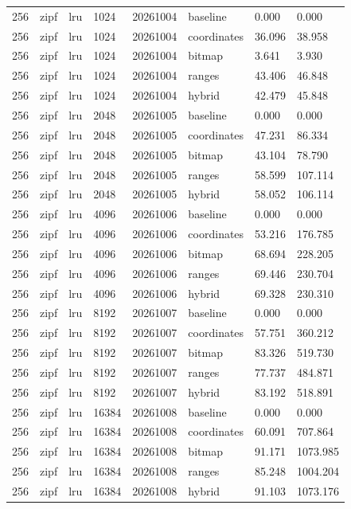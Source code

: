 \begin{tabular}{llllllll}
256 & zipf & lru & 1024 & 20261004 & baseline & 0.000 & 0.000 \\
256 & zipf & lru & 1024 & 20261004 & coordinates & 36.096 & 38.958 \\
256 & zipf & lru & 1024 & 20261004 & bitmap & 3.641 & 3.930 \\
256 & zipf & lru & 1024 & 20261004 & ranges & 43.406 & 46.848 \\
256 & zipf & lru & 1024 & 20261004 & hybrid & 42.479 & 45.848 \\
256 & zipf & lru & 2048 & 20261005 & baseline & 0.000 & 0.000 \\
256 & zipf & lru & 2048 & 20261005 & coordinates & 47.231 & 86.334 \\
256 & zipf & lru & 2048 & 20261005 & bitmap & 43.104 & 78.790 \\
256 & zipf & lru & 2048 & 20261005 & ranges & 58.599 & 107.114 \\
256 & zipf & lru & 2048 & 20261005 & hybrid & 58.052 & 106.114 \\
256 & zipf & lru & 4096 & 20261006 & baseline & 0.000 & 0.000 \\
256 & zipf & lru & 4096 & 20261006 & coordinates & 53.216 & 176.785 \\
256 & zipf & lru & 4096 & 20261006 & bitmap & 68.694 & 228.205 \\
256 & zipf & lru & 4096 & 20261006 & ranges & 69.446 & 230.704 \\
256 & zipf & lru & 4096 & 20261006 & hybrid & 69.328 & 230.310 \\
256 & zipf & lru & 8192 & 20261007 & baseline & 0.000 & 0.000 \\
256 & zipf & lru & 8192 & 20261007 & coordinates & 57.751 & 360.212 \\
256 & zipf & lru & 8192 & 20261007 & bitmap & 83.326 & 519.730 \\
256 & zipf & lru & 8192 & 20261007 & ranges & 77.737 & 484.871 \\
256 & zipf & lru & 8192 & 20261007 & hybrid & 83.192 & 518.891 \\
256 & zipf & lru & 16384 & 20261008 & baseline & 0.000 & 0.000 \\
256 & zipf & lru & 16384 & 20261008 & coordinates & 60.091 & 707.864 \\
256 & zipf & lru & 16384 & 20261008 & bitmap & 91.171 & 1073.985 \\
256 & zipf & lru & 16384 & 20261008 & ranges & 85.248 & 1004.204 \\
256 & zipf & lru & 16384 & 20261008 & hybrid & 91.103 & 1073.176 \\

\end{tabular}
